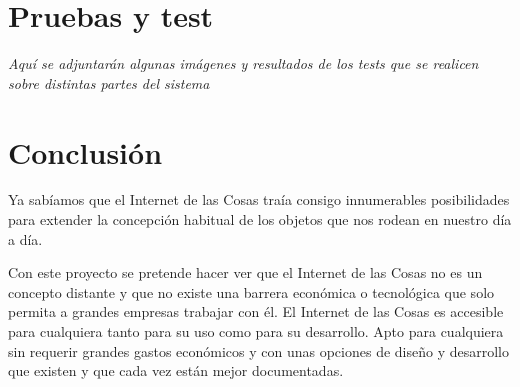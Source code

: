 \documentclass[a4paper,10pt]{article}
\begin{document}
\newpage

\section{Pruebas y test}

\textit{Aquí se adjuntarán algunas imágenes y resultados de los tests
  que se realicen sobre distintas partes del sistema}

\newpage

\section{Conclusión}

Ya sabíamos que el Internet de las Cosas traía consigo innumerables
posibilidades para extender la concepción habitual de los objetos que
nos rodean en nuestro día a día.

Con este proyecto se pretende hacer ver que el Internet de las Cosas
no es un concepto distante y que no existe una barrera económica o
tecnológica que solo permita a grandes empresas trabajar con él. El
Internet de las Cosas es accesible para cualquiera tanto para su uso
como para su desarrollo. Apto para cualquiera sin requerir grandes
gastos económicos y con unas opciones de diseño y desarrollo que
existen y que cada vez están mejor documentadas.


\newpage


 
\end{document}
